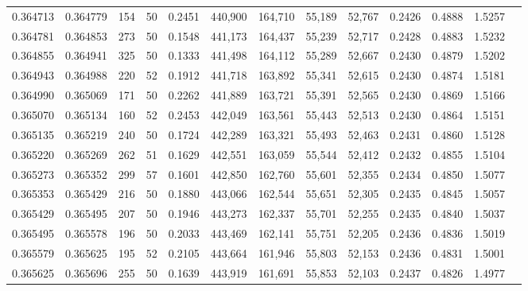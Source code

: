 \begin{tabular}{rrrrrrrrrrrrr}
0.364713 & 0.364779 &   154 &  50 &                                     0.2451 & 440,900 & 164,710 &  55,189 &  52,767 & 0.2426 & 0.4888 & 1.5257 \\
0.364781 & 0.364853 &   273 &  50 &                                     0.1548 & 441,173 & 164,437 &  55,239 &  52,717 & 0.2428 & 0.4883 & 1.5232 \\
0.364855 & 0.364941 &   325 &  50 &                                     0.1333 & 441,498 & 164,112 &  55,289 &  52,667 & 0.2430 & 0.4879 & 1.5202 \\
0.364943 & 0.364988 &   220 &  52 &                                     0.1912 & 441,718 & 163,892 &  55,341 &  52,615 & 0.2430 & 0.4874 & 1.5181 \\
0.364990 & 0.365069 &   171 &  50 &                                     0.2262 & 441,889 & 163,721 &  55,391 &  52,565 & 0.2430 & 0.4869 & 1.5166 \\
0.365070 & 0.365134 &   160 &  52 &                                     0.2453 & 442,049 & 163,561 &  55,443 &  52,513 & 0.2430 & 0.4864 & 1.5151 \\
0.365135 & 0.365219 &   240 &  50 &                                     0.1724 & 442,289 & 163,321 &  55,493 &  52,463 & 0.2431 & 0.4860 & 1.5128 \\
0.365220 & 0.365269 &   262 &  51 &                                     0.1629 & 442,551 & 163,059 &  55,544 &  52,412 & 0.2432 & 0.4855 & 1.5104 \\
0.365273 & 0.365352 &   299 &  57 &                                     0.1601 & 442,850 & 162,760 &  55,601 &  52,355 & 0.2434 & 0.4850 & 1.5077 \\
0.365353 & 0.365429 &   216 &  50 &                                     0.1880 & 443,066 & 162,544 &  55,651 &  52,305 & 0.2435 & 0.4845 & 1.5057 \\
0.365429 & 0.365495 &   207 &  50 &                                     0.1946 & 443,273 & 162,337 &  55,701 &  52,255 & 0.2435 & 0.4840 & 1.5037 \\
0.365495 & 0.365578 &   196 &  50 &                                     0.2033 & 443,469 & 162,141 &  55,751 &  52,205 & 0.2436 & 0.4836 & 1.5019 \\
0.365579 & 0.365625 &   195 &  52 &                                     0.2105 & 443,664 & 161,946 &  55,803 &  52,153 & 0.2436 & 0.4831 & 1.5001 \\
0.365625 & 0.365696 &   255 &  50 &                                     0.1639 & 443,919 & 161,691 &  55,853 &  52,103 & 0.2437 & 0.4826 & 1.4977 \\

\end{tabular}
